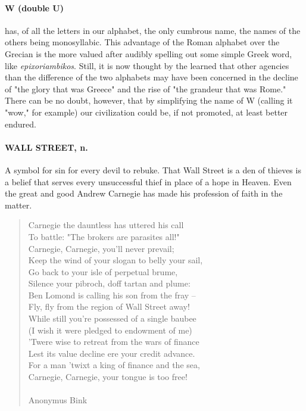 \documentclass[11pt]{article}
\begin{document}
\paragraph{W (double U)} has, of all the letters in our alphabet, the only
cumbrous name, the names of the others being monosyllabic.  This
advantage of the Roman alphabet over the Grecian is the more valued
after audibly spelling out some simple Greek word, like
{\em epixoriambikos}.  Still, it is now thought by the learned that other
agencies than the difference of the two alphabets may have been
concerned in the decline of "the glory that was Greece" and the rise
of "the grandeur that was Rome."  There can be no doubt, however, that
by simplifying the name of W (calling it "wow," for example) our
civilization could be, if not promoted, at least better endured.

\paragraph{WALL STREET, n.}  A symbol for sin for every devil to rebuke.  That
Wall Street is a den of thieves is a belief that serves every
unsuccessful thief in place of a hope in Heaven.  Even the great and
good Andrew Carnegie has made his profession of faith in the matter.

\begin{quote}   Carnegie the dauntless has uttered his call \\
  To battle:  "The brokers are parasites all!" \\
  Carnegie, Carnegie, you'll never prevail; \\
  Keep the wind of your slogan to belly your sail, \\
  Go back to your isle of perpetual brume, \\
  Silence your pibroch, doff tartan and plume: \\
  Ben Lomond is calling his son from the fray -- \\
  Fly, fly from the region of Wall Street away! \\
  While still you're possessed of a single baubee \\
  (I wish it were pledged to endowment of me) \\
  'Twere wise to retreat from the wars of finance \\
  Lest its value decline ere your credit advance. \\
  For a man 'twixt a king of finance and the sea, \\
  Carnegie, Carnegie, your tongue is too free! \\
 \\
Anonymus Bink \end{quote}
\end{document}
